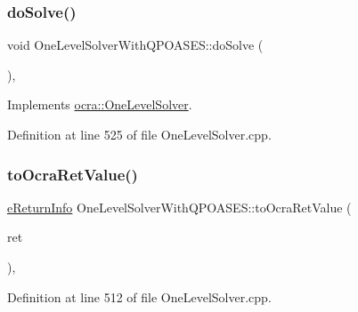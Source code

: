 \subsubsection{\texorpdfstring{do\+Solve()}{doSolve()}}
{\footnotesize\ttfamily void One\+Level\+Solver\+With\+Q\+P\+O\+A\+S\+E\+S\+::do\+Solve (\begin{DoxyParamCaption}\item[{void}]{ }\end{DoxyParamCaption})\hspace{0.3cm}{\ttfamily [protected]}, {\ttfamily [virtual]}}



Implements \hyperlink{classocra_1_1OneLevelSolver_aeb4fb349df382921c5c0064d7a05c48b}{ocra\+::\+One\+Level\+Solver}.



Definition at line 525 of file One\+Level\+Solver.\+cpp.

\hypertarget{classocra_1_1OneLevelSolverWithQPOASES_a8fa99c1dbded56a7ecc69a3d756f1277}{}\label{classocra_1_1OneLevelSolverWithQPOASES_a8fa99c1dbded56a7ecc69a3d756f1277} 
\subsubsection{\texorpdfstring{to\+Ocra\+Ret\+Value()}{toOcraRetValue()}}
{\footnotesize\ttfamily \hyperlink{namespaceocra_aa1d873ac30cb0a0f79ba978745de294b}{e\+Return\+Info} One\+Level\+Solver\+With\+Q\+P\+O\+A\+S\+E\+S\+::to\+Ocra\+Ret\+Value (\begin{DoxyParamCaption}\item[{const qp\+O\+A\+S\+E\+S\+::return\+Value \&}]{ret }\end{DoxyParamCaption})\hspace{0.3cm}{\ttfamily [static]}, {\ttfamily [protected]}}



Definition at line 512 of file One\+Level\+Solver.\+cpp.

\hypertarget{classocra_1_1OneLevelSolverWithQPOASES_abbe458ba193d545d6c07b09f582d6ce7}{}\label{classocra_1_1OneLevelSolverWithQPOASES_abbe458ba193d545d6c07b09f582d6ce7} 
